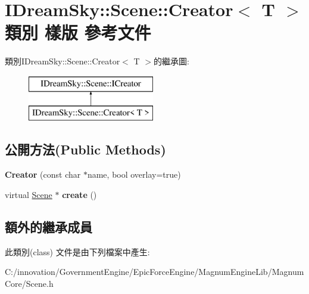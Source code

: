 \hypertarget{class_i_dream_sky_1_1_scene_1_1_creator}{}\section{I\+Dream\+Sky\+:\+:Scene\+:\+:Creator$<$ T $>$ 類別 樣版 參考文件}
\label{class_i_dream_sky_1_1_scene_1_1_creator}
類別\+I\+Dream\+Sky\+:\+:Scene\+:\+:Creator$<$ T $>$的繼承圖\+:\begin{figure}[H]
\begin{center}
\leavevmode
\includegraphics[height=2.000000cm]{class_i_dream_sky_1_1_scene_1_1_creator}
\end{center}
\end{figure}
\subsection*{公開方法(Public Methods)}
\begin{DoxyCompactItemize}
\item 
{\bfseries Creator} (const char $\ast$name, bool overlay=true)\hypertarget{class_i_dream_sky_1_1_scene_1_1_creator_ab1e5f74489659d78496bc26b29d93304}{}\label{class_i_dream_sky_1_1_scene_1_1_creator_ab1e5f74489659d78496bc26b29d93304}

\item 
virtual \hyperlink{class_i_dream_sky_1_1_scene}{Scene} $\ast$ {\bfseries create} ()\hypertarget{class_i_dream_sky_1_1_scene_1_1_creator_a0f124ad00e92e1cbe14789057aac7118}{}\label{class_i_dream_sky_1_1_scene_1_1_creator_a0f124ad00e92e1cbe14789057aac7118}

\end{DoxyCompactItemize}
\subsection*{額外的繼承成員}


此類別(class) 文件是由下列檔案中產生\+:\begin{DoxyCompactItemize}
\item 
C\+:/innovation/\+Government\+Engine/\+Epic\+Force\+Engine/\+Magnum\+Engine\+Lib/\+Magnum\+Core/Scene.\+h\end{DoxyCompactItemize}
